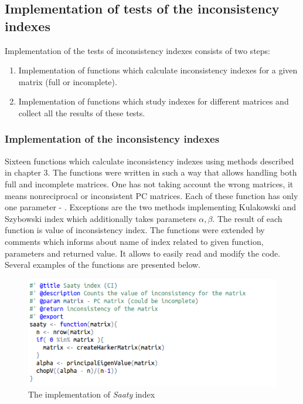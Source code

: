 \subsection{Implementation of tests of the inconsistency indexes}
Implementation of the tests of inconsistency indexes consists of two steps:
\begin{enumerate}
  \item Implementation of functions which calculate inconsistency indexes for a given matrix (full or incomplete).
  \item Implementation of functions which study indexes for different matrices and collect all the results of these tests. 
\end{enumerate}

\subsubsection{Implementation of the inconsistency indexes}
Sixteen functions which calculate inconsistency indexes using methods described in chapter 3. The functions were written in such a way that allows handling both full and incomplete matrices. One has not taking account the wrong matrices, it means nonreciprocal or inconsistent PC matrices. Each of these function has only one parameter - . Exceptions are the two methods implementing Kulakowski and Szybowski index which additionally takes parameters $\alpha, \beta$. The result of each function is value of inconsistency index. The functions were extended by comments which informs about name of index related to given function, parameters and returned value. It allows to easily read and modify the code. Several examples of the functions are presented below.

\begin{figure}[h]
\centerline{\includegraphics[scale=0.75]{images/kod1.png}}
\caption{The implementation of \textit{Saaty} index}
\label{fig:rstudio}
\end{figure}

